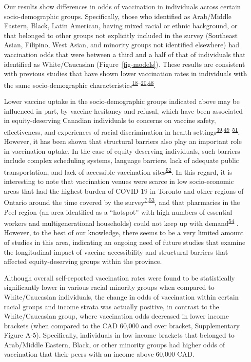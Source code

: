 \documentclass[
  letterpaper,
  DIV=11,
  numbers=noendperiod]{scrartcl}
\begin{document}
Our results show differences in odds of vaccination in individuals
across certain socio-demographic groups. Specifically, those who
identified as Arab/Middle Eastern, Black, Latin American, having mixed
racial or ethnic background, or that belonged to other groups not
explicitly included in the survey (Southeast Asian, Filipino, West
Asian, and minority groups not identified elsewhere) had vaccination
odds that were between a third and a half of that of individuals that
identified as White/Caucasian (Figure~\ref{fig-models}). These results
are consistent with previous studies that have shown lower vaccination
rates in individuals with the same socio-demographic
characteristics\textsuperscript{\protect\hyperlink{ref-guay2022}{18}--\protect\hyperlink{ref-hussain2022}{20},\protect\hyperlink{ref-carter2022}{48}}.

Lower vaccine uptake in the socio-demographic groups indicated above may
be influenced in part, by vaccine hesitancy and refusal, which have been
associated in equity-deserving Canadian individuals to concerns on
vaccine safety, effectiveness, and experiences of racial discrimination
in health
settings\textsuperscript{\protect\hyperlink{ref-cnat2022a}{39},\protect\hyperlink{ref-basta2022}{49}--\protect\hyperlink{ref-cnat2023}{51}}.
However, it has been shown that structural barriers also play an
important role in vaccination uptake. In the case of equity-deserving
individuals, such barriers include complex scheduling systems, language
barriers, lack of adequate public transportation, and lack of accessible
vaccination
sites\textsuperscript{\protect\hyperlink{ref-njoku2021}{52}}. In this
regard, it is interesting to note that vaccination venues were scarce in
low socio-economic areas that had the highest burden of COVID-19 in
Toronto and other regions of Ontario around the time covered by the
survey\textsuperscript{\protect\hyperlink{ref-bogoch2022}{7},\protect\hyperlink{ref-iveniuk2021}{53}},
and that pharmacies in the Peel region (an area identified as a
``hotspot'' with high numbers of essential workers and multigenerational
households) could not keep up with
demand\textsuperscript{\protect\hyperlink{ref-gill2022}{54}} . However,
to the best of our knowledge, there seems to be a very limited amount of
studies in this area, indicating an ongoing need of future studies that
examine the longitudinal impact of vaccine accessibility and structural
barriers that affected equity-deserving groups within the province.

Although overall self-reported vaccination rates were found to be
statistically significantly lower in various racial minority groups when
compared to White/Caucasian individuals, the change in odds of
vaccination within certain racial groups and income strata was actually
positive, in contrast to the White/Caucasian group, where vaccination
odds decreased in lower income brackets (when compared to the CAD 60,000
and over bracket, Supplementary Figure A-5). Specifically, individuals
in low income brackets that belonged to Arab/Middle Eastern, Black, or
other minority groups had higher odds of vaccination that their peers
with an income above 60,000 CAD.
\end{document}

